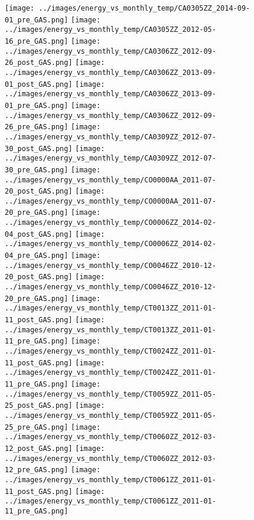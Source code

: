 \clearpage
\begin{figure}
\centering
\texttt{[image: ../images/energy\_vs\_monthly\_temp/CA0305ZZ\_2014-09-01\_pre\_GAS.png]}
\texttt{[image: ../images/energy\_vs\_monthly\_temp/CA0305ZZ\_2012-05-16\_pre\_GAS.png]}
\texttt{[image: ../images/energy\_vs\_monthly\_temp/CA0306ZZ\_2012-09-26\_post\_GAS.png]}
\texttt{[image: ../images/energy\_vs\_monthly\_temp/CA0306ZZ\_2013-09-01\_post\_GAS.png]}
\texttt{[image: ../images/energy\_vs\_monthly\_temp/CA0306ZZ\_2013-09-01\_pre\_GAS.png]}
\texttt{[image: ../images/energy\_vs\_monthly\_temp/CA0306ZZ\_2012-09-26\_pre\_GAS.png]}
\texttt{[image: ../images/energy\_vs\_monthly\_temp/CA0309ZZ\_2012-07-30\_post\_GAS.png]}
\texttt{[image: ../images/energy\_vs\_monthly\_temp/CA0309ZZ\_2012-07-30\_pre\_GAS.png]}
\texttt{[image: ../images/energy\_vs\_monthly\_temp/CO0000AA\_2011-07-20\_post\_GAS.png]}
\texttt{[image: ../images/energy\_vs\_monthly\_temp/CO0000AA\_2011-07-20\_pre\_GAS.png]}
\texttt{[image: ../images/energy\_vs\_monthly\_temp/CO0006ZZ\_2014-02-04\_post\_GAS.png]}
\texttt{[image: ../images/energy\_vs\_monthly\_temp/CO0006ZZ\_2014-02-04\_pre\_GAS.png]}
\texttt{[image: ../images/energy\_vs\_monthly\_temp/CO0046ZZ\_2010-12-20\_post\_GAS.png]}
\texttt{[image: ../images/energy\_vs\_monthly\_temp/CO0046ZZ\_2010-12-20\_pre\_GAS.png]}
\texttt{[image: ../images/energy\_vs\_monthly\_temp/CT0013ZZ\_2011-01-11\_post\_GAS.png]}
\texttt{[image: ../images/energy\_vs\_monthly\_temp/CT0013ZZ\_2011-01-11\_pre\_GAS.png]}
\texttt{[image: ../images/energy\_vs\_monthly\_temp/CT0024ZZ\_2011-01-11\_post\_GAS.png]}
\texttt{[image: ../images/energy\_vs\_monthly\_temp/CT0024ZZ\_2011-01-11\_pre\_GAS.png]}
\texttt{[image: ../images/energy\_vs\_monthly\_temp/CT0059ZZ\_2011-05-25\_post\_GAS.png]}
\texttt{[image: ../images/energy\_vs\_monthly\_temp/CT0059ZZ\_2011-05-25\_pre\_GAS.png]}
\texttt{[image: ../images/energy\_vs\_monthly\_temp/CT0060ZZ\_2012-03-12\_post\_GAS.png]}
\texttt{[image: ../images/energy\_vs\_monthly\_temp/CT0060ZZ\_2012-03-12\_pre\_GAS.png]}
\texttt{[image: ../images/energy\_vs\_monthly\_temp/CT0061ZZ\_2011-01-11\_post\_GAS.png]}
\texttt{[image: ../images/energy\_vs\_monthly\_temp/CT0061ZZ\_2011-01-11\_pre\_GAS.png]}
\end{figure}
